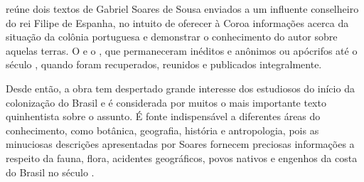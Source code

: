\hspace*{-7cm}\hrulefill\hspace*{-7cm}

\medskip

 reúne dois textos de
Gabriel Soares de Sousa enviados a um influente conselheiro do rei
Filipe  de Espanha, no intuito de oferecer à Coroa informações acerca
da situação da colônia portuguesa e demonstrar o conhecimento do autor
sobre aquelas terras.  O {} e o {}, que permaneceram
inéditos e anônimos ou apócrifos até o século , quando foram
recuperados, reunidos e publicados integralmente.

Desde então, a obra tem despertado grande interesse dos estudiosos do
início da colonização do Brasil e é considerada por muitos o mais
importante texto quinhentista sobre o assunto. É fonte indispensável a
diferentes áreas do conhecimento, como botânica, geografia, história e
antropologia, pois as minuciosas descrições apresentadas por Soares
fornecem preciosas informações a respeito da fauna, flora, acidentes
geográficos, povos nativos e engenhos da costa do Brasil no
século .

\vfill

\hspace*{-.4cm}\begin{minipage}[c]{.5\linewidth}
\small{
{}}
\end{minipage}

\pagebreak

